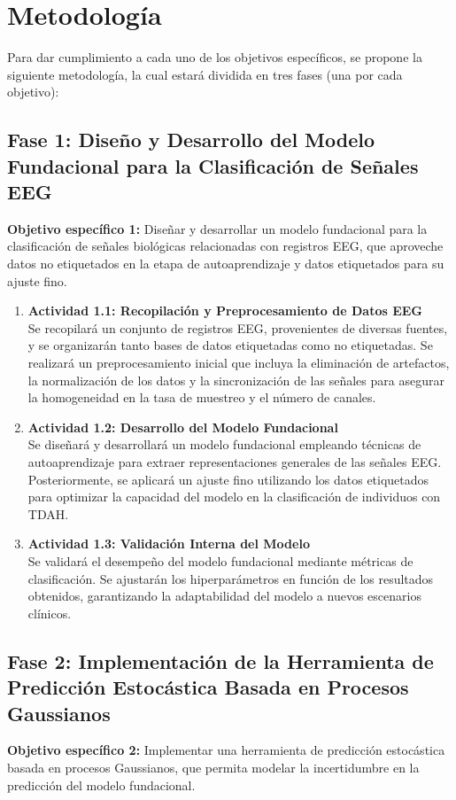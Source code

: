\section{Metodología}

Para dar cumplimiento a cada uno de los objetivos específicos, se propone la siguiente metodología, la cual estará dividida en tres fases (una por cada objetivo):

\subsection*{Fase 1: Diseño y Desarrollo del Modelo Fundacional para la Clasificación de Señales EEG}
\textbf{Objetivo específico 1:} Diseñar y desarrollar un modelo fundacional para la clasificación de señales biológicas relacionadas con registros EEG, que aproveche datos no etiquetados en la etapa de autoaprendizaje y datos etiquetados para su ajuste fino.

\begin{enumerate}
	\item \textbf{Actividad 1.1: Recopilación y Preprocesamiento de Datos EEG}\\
	Se recopilará un conjunto de registros EEG, provenientes de diversas fuentes, y se organizarán tanto bases de datos etiquetadas como no etiquetadas. Se realizará un preprocesamiento inicial que incluya la eliminación de artefactos, la normalización de los datos y la sincronización de las señales para asegurar la homogeneidad en la tasa de muestreo y el número de canales.
	
	\item \textbf{Actividad 1.2: Desarrollo del Modelo Fundacional}\\
	Se diseñará y desarrollará un modelo fundacional empleando técnicas de autoaprendizaje para extraer representaciones generales de las señales EEG. Posteriormente, se aplicará un ajuste fino utilizando los datos etiquetados para optimizar la capacidad del modelo en la clasificación de individuos con TDAH.
	
	\item \textbf{Actividad 1.3: Validación Interna del Modelo}\\
	Se validará el desempeño del modelo fundacional mediante métricas de clasificación. Se ajustarán los hiperparámetros en función de los resultados obtenidos, garantizando la adaptabilidad del modelo a nuevos escenarios clínicos.
\end{enumerate}

\subsection*{Fase 2: Implementación de la Herramienta de Predicción Estocástica Basada en Procesos Gaussianos}
\textbf{Objetivo específico 2:} Implementar una herramienta de predicción estocástica basada en procesos Gaussianos, que permita modelar la incertidumbre en la predicción del modelo fundacional.

